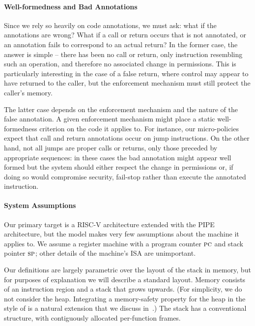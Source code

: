 \documentclass[acmsmall,review,anonymous]{acmart}\settopmatter{printfolios=true,printccs=false,printacmref=false}
\begin{document}
\paragraph*{Well-formedness and Bad Annotations}

Since we rely so heavily on code annotations, we must ask: what if the annotations
are wrong? What if a call or return occurs that is not annotated, or an annotation
fails to correspond to an actual return? In the former case, the answer is simple --
there has been no call or return, only instruction resembling such an operation, and
therefore no associated change in permissions. This is particularly interesting in the
case of a false return, where control may appear to have returned to the caller, but
the enforcement mechanism must still protect the caller's memory.

The latter case depends on the enforcement mechanism and the nature of the false
annotation. A given enforcement mechanism might place a static well-formedness criterion
on the code it applies to. For instance, our micro-policies expect that call and return
annotations occur on jump instructions. On the other hand, not all jumps are proper
calls or returns, only those preceded by appropriate sequences: in these cases the
bad annotation might appear well formed but the system should either respect the change
in permissions or, if doing so would compromise security, fail-stop rather than
execute the annotated instruction.

\paragraph*{System Assumptions}

Our primary target is a RISC-V architecture extended with the PIPE architecture, but the
model makes very few assumptions about the machine it applies to. We assume a register
machine with a program counter \(\textsc{pc}\) and stack pointer \(\textsc{sp}\); other details of
the machine's ISA are unimportant.

Our definitions are largely parametric over the layout of the stack in memory, but for
purposes of explanation we will describe a standard layout. Memory consists of an
instruction region and a stack that grows upwards. (For simplicity,
we do not consider the heap. Integrating a memory-safety property for the
heap in the style of \citet{DBLP:conf/post/AmorimHP18} is a natural extension
that we discuss in~.) The stack has a conventional structure, with
contiguously allocated per-function frames.
\end{document}
